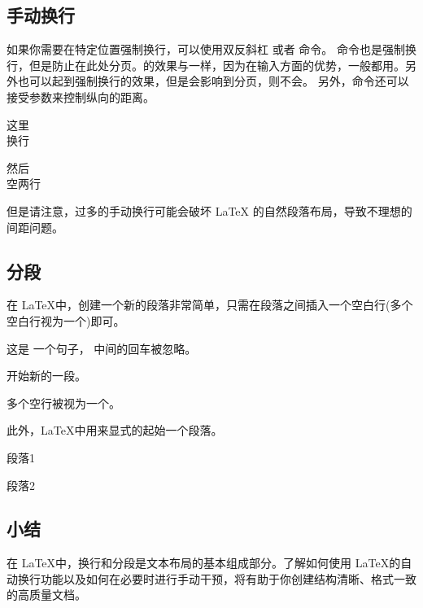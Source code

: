 {{{\subsection{手动换行}
如果你需要在特定位置强制换行，可以使用双反斜杠 \texinline{\\} 或者 \texinline{\newline} 命令。
\texinline{\\*}命令也是强制换行，但是防止在此处分页。\texinline{\newline}的效果与\texinline{\\}一样，因为\texinline{\\}在输入方面的优势，一般都用\texinline{\\}。另外\texinline{\linebreak}也可以起到强制换行的效果，但是\texinline{\linebreak}会影响到分页，\texinline{\newline}则不会。
另外，\texinline{\\}命令还可以接受参数来控制纵向的距离。
\begin{texlst}
	这里\\换行

	然后\\[2em]空两行
\end{texlst}

但是请注意，过多的手动换行可能会破坏 LaTeX 的自然段落布局，导致不理想的间距问题。
\subsection{分段}
在 \LaTeX 中，创建一个新的段落非常简单，只需在段落之间插入一个空白行(多个空白行视为一个)即可。
\begin{texlst}
	这是
	一个句子，
	中间的回车被忽略。

	开始新的一段。



	多个空行被视为一个。
\end{texlst}

此外，\LaTeX 中用\texinline{\par}来显式的起始一个段落。

\begin{texlst}
	段落1\par 段落2
\end{texlst}

\subsection{小结}
在 \LaTeX 中，换行和分段是文本布局的基本组成部分。了解如何使用 \LaTeX 的自动换行功能以及如何在必要时进行手动干预，将有助于你创建结构清晰、格式一致的高质量文档。

}}}
